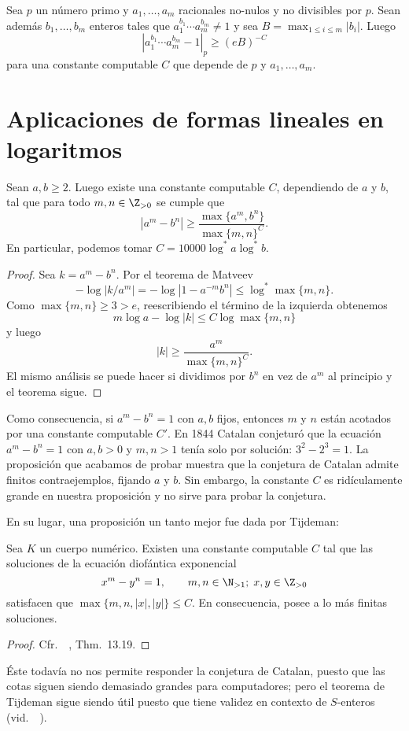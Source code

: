 \documentclass[11pt, reqno]{amsart}
\begin{document}
\begin{thm}[Yu, 1986]
	\label{Yu86}
	Sea $p$ un número primo y $a_1,\ldots,a_m$ racionales no-nulos y no divisibles por $p$. Sean además $b_1,\ldots,b_m$ enteros tales que $a_1^{b_1}\cdots a_m^{b_m}\neq 1$ y sea $B=\max_{1\leq i\leq m}|b_i|$.
	Luego
	\[
		|a_1^{b_1}\cdots a_m^{b_m}-1|_p\geq (eB)^{-C}
	\]
	para una constante computable $C$ que depende de $p$ y $a_1,\ldots,a_m$. 
\end{thm}

\section{Aplicaciones de formas lineales en logaritmos}
\begin{prop}
	Sean $a,b\geq 2$.
	Luego existe una constante computable $C$, dependiendo de $a$ y $b$, tal que para todo $m,n\in \Z_{>0}$ se cumple que
	\[
		|a^m-b^n|\geq \frac{\max\{a^m,b^n\}}{\max\{m,n\}^C}.
	\]
	En particular, podemos tomar $C=10000\log^* a\log^* b$.
\end{prop}
\begin{proof}
	Sea $k=a^m-b^n$. Por el teorema de Matveev $$-\log|k/a^m|=-\log|1-a^{-m}b^n|\leq \log^*\max\{m,n\}.$$
	Como $\max\{m,n\}\geq 3>e$, reescribiendo el término de la izquierda obtenemos $$m\log a-\log|k|\leq C\log\max\{m,n\}$$ y luego $$|k|\geq \frac{a^m}{\max\{m,n\}^C}.$$ El mismo análisis se puede hacer si dividimos por $b^n$ en vez de $a^m$ al principio y el teorema sigue.
\end{proof}

Como consecuencia, si $a^m-b^n=1$ con $a,b$ fijos, entonces $m$ y $n$ están acotados por una constante computable $C'$.
En 1844 Catalan conjeturó que la ecuación $a^m-b^n=1$ con $a,b>0$ y $m,n>1$ tenía solo por solución: $3^2 - 2^3 = 1$.
La proposición que acabamos de probar muestra que la conjetura de Catalan admite finitos contraejemplos, fijando $a$ y $b$.
Sin embargo, la constante $C$ es ridículamente grande en nuestra proposición y no sirve para probar la conjetura.

En su lugar, una proposición un tanto mejor fue dada por Tijdeman:
\begin{thm}[Tijdeman, 1976]
	Sea $K$ un cuerpo numérico.
	Existen una constante computable $C$ tal que las soluciones de la ecuación diofántica exponencial
	$$ x^m - y^n = 1, \qquad m, n \in \N_{>1}; \; x, y \in \Z_{>0} $$
	satisfacen que $\max\{ m, n, |x|, |y| \} \le C$.
	En consecuencia, posee a lo más finitas soluciones.
\end{thm}
\begin{proof}
	Cfr.\ \citeauthor{bilu:catalan}~\cite[176\psqq]{bilu:catalan}, Thm.~13.19.
\end{proof}
Éste todavía no nos permite responder la conjetura de Catalan, puesto que las cotas siguen siendo demasiado grandes para computadores;
pero el teorema de Tijdeman sigue siendo útil puesto que tiene validez en contexto de $S$-enteros (vid.\ \citeauthor{brindza87catalan}~\cite{brindza87catalan}).
\end{document}
